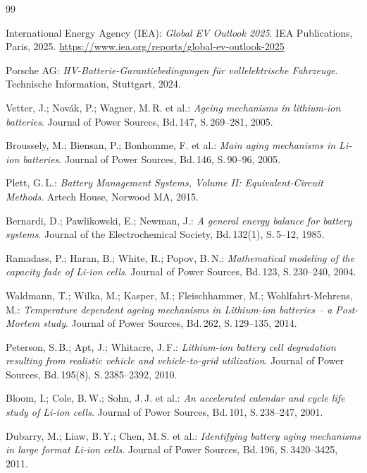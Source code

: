 ﻿\documentclass[a4paper,12pt]{article}
\theoremstyle{definition}
\begin{document}
\begin{thebibliography}{99}

  International Energy Agency (IEA):
  \emph{Global EV Outlook 2025}.
  IEA Publications, Paris, 2025.
  \url{https://www.iea.org/reports/global-ev-outlook-2025}

  Porsche AG:
  \emph{HV-Batterie-Garantiebedingungen für vollelektrische Fahrzeuge}.
  Technische Information, Stuttgart, 2024.

  Vetter, J.; Nov\'ak, P.; Wagner, M.\,R. et al.:
  \emph{Ageing mechanisms in lithium-ion batteries}.
  Journal of Power Sources, Bd.\,147, S.\,269--281, 2005.

  Broussely, M.; Biensan, P.; Bonhomme, F. et al.:
  \emph{Main aging mechanisms in Li-ion batteries}.
  Journal of Power Sources, Bd.\,146, S.\,90--96, 2005.

  Plett, G.\,L.:
  \emph{Battery Management Systems, Volume II: Equivalent-Circuit Methods}.
  Artech House, Norwood MA, 2015.

  Bernardi, D.; Pawlikowski, E.; Newman, J.:
  \emph{A general energy balance for battery systems}.
  Journal of the Electrochemical Society, Bd.\,132(1), S.\,5--12, 1985.

  Ramadass, P.; Haran, B.; White, R.; Popov, B.\,N.:
  \emph{Mathematical modeling of the capacity fade of Li-ion cells}.
  Journal of Power Sources, Bd.\,123, S.\,230--240, 2004.

  Waldmann, T.; Wilka, M.; Kasper, M.; Fleischhammer, M.; Wohlfahrt-Mehrens, M.:
  \emph{Temperature dependent ageing mechanisms in Lithium-ion batteries --
    a Post-Mortem study}.
  Journal of Power Sources, Bd.\,262, S.\,129--135, 2014.

  Peterson, S.\,B.; Apt, J.; Whitacre, J.\,F.:
  \emph{Lithium-ion battery cell degradation resulting from realistic
    vehicle and vehicle-to-grid utilization}.
  Journal of Power Sources, Bd.\,195(8), S.\,2385--2392, 2010.

  Bloom, I.; Cole, B.\,W.; Sohn, J.\,J. et al.:
  \emph{An accelerated calendar and cycle life study of Li-ion cells}.
  Journal of Power Sources, Bd.\,101, S.\,238--247, 2001.

  Dubarry, M.; Liaw, B.\,Y.; Chen, M.\,S. et al.:
  \emph{Identifying battery aging mechanisms in large format Li-ion cells}.
  Journal of Power Sources, Bd.\,196, S.\,3420--3425, 2011.


\end{thebibliography}
\end{document}
